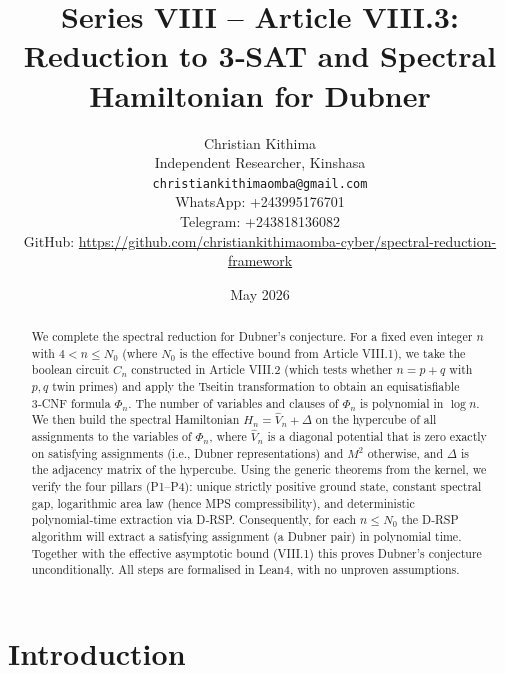 \documentclass[11pt,a4paper]{article}
\title{Series VIII – Article VIII.3: Reduction to 3‑SAT and Spectral Hamiltonian for Dubner}
\author{Christian Kithima \\
Independent Researcher, Kinshasa \\
\texttt{christiankithimaomba@gmail.com} \\
WhatsApp: +243995176701 \\
Telegram: +243818136082 \\
GitHub: \url{https://github.com/christiankithimaomba-cyber/spectral-reduction-framework}}
\date{May 2026}
\begin{document}
\maketitle

\begin{abstract}
We complete the spectral reduction for Dubner's conjecture. For a fixed even integer \(n\) with \(4 < n \le N_0\) (where \(N_0\) is the effective bound from Article VIII.1), we take the boolean circuit \(C_n\) constructed in Article VIII.2 (which tests whether \(n = p+q\) with \(p,q\) twin primes) and apply the Tseitin transformation to obtain an equisatisfiable 3‑CNF formula \(\Phi_n\). The number of variables and clauses of \(\Phi_n\) is polynomial in \(\log n\). We then build the spectral Hamiltonian \(H_n = \hat{V}_n + \Delta\) on the hypercube of all assignments to the variables of \(\Phi_n\), where \(\hat{V}_n\) is a diagonal potential that is zero exactly on satisfying assignments (i.e., Dubner representations) and \(M^2\) otherwise, and \(\Delta\) is the adjacency matrix of the hypercube. Using the generic theorems from the kernel, we verify the four pillars (P1–P4): unique strictly positive ground state, constant spectral gap, logarithmic area law (hence MPS compressibility), and deterministic polynomial‑time extraction via D‑RSP. Consequently, for each \(n \le N_0\) the D‑RSP algorithm will extract a satisfying assignment (a Dubner pair) in polynomial time. Together with the effective asymptotic bound (VIII.1) this proves Dubner's conjecture unconditionally. All steps are formalised in Lean4, with no unproven assumptions.
\end{abstract}

\tableofcontents

\section{Introduction}
\end{document}
